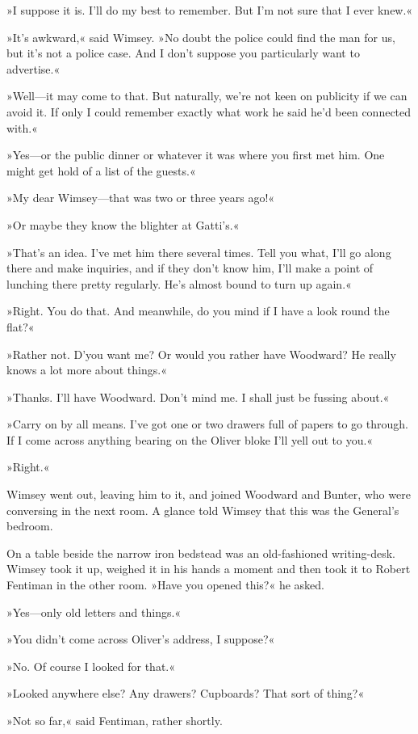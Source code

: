 »I suppose it is. I'll do my best to remember. But I'm not sure that I ever knew.«

»It's awkward,« said Wimsey. »No doubt the police could find the man for us, but it's not a police case. And I don't suppose you particularly want to advertise.«

»Well—it may come to that. But naturally, we're not keen on publicity if we can avoid it. If only I could remember exactly what work he said he'd been connected with.«

»Yes—or the public dinner or whatever it was where you first met him. One might get hold of a list of the guests.«

»My dear Wimsey—that was two or three years ago!«

»Or maybe they know the blighter at Gatti's.«

»That's an idea. I've met him there several times. Tell you what, I'll go along there and make inquiries, and if they don't know him, I'll make a point of lunching there pretty regularly. He's almost bound to turn up again.«

»Right. You do that. And meanwhile, do you mind if I have a look round the flat?«

»Rather not. D'you want me? Or would you rather have Woodward? He really knows a lot more about things.«

»Thanks. I'll have Woodward. Don't mind me. I shall just be fussing about.«

»Carry on by all means. I've got one or two drawers full of papers to go through. If I come across anything bearing on the Oliver bloke I'll yell out to you.«

»Right.«

Wimsey went out, leaving him to it, and joined Woodward and Bunter, who were conversing in the next room. A glance told Wimsey that this was the General's bedroom.

On a table beside the narrow iron bedstead was an old-fashioned writing-desk. Wimsey took it up, weighed it in his hands a moment and then took it to Robert Fentiman in the other room. »Have you opened this?« he asked.

»Yes—only old letters and things.«

»You didn't come across Oliver's address, I suppose?«

»No. Of course I looked for that.«

»Looked anywhere else? Any drawers? Cupboards? That sort of thing?«

»Not so far,« said Fentiman, rather shortly.

